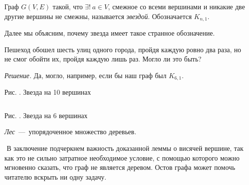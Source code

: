 \begin{paracol}{2}
\begin{definition}
	Граф $G(V, E)$ такой, что $\exists! \!\ a \in V$, смежное со всеми вершинами и никакие две другие вершины не смежны, называется \emph{звездой}. Обозначается $K_{n, 1}$.
\end{definition}

	Далее мы объясним, почему звезда имеет такое странное обозначение.

\begin{example}
	Пешеход обошел шесть улиц одного города, пройдя каждую ровно два раза, но не смог обойти их, пройдя каждую лишь раз. Могло ли это быть?
	
	\emph{Решение.} Да, могло, например, если бы наш граф был $K_{6, 1}$.
\end{example}

\switchcolumn
 
\begin{center}

	\small Рис. \images. Звезда на 10 вершинах
\end{center}
$ $
\newline
\begin{center}

	\small Рис. \images. Звезда на 6 вершинах
\end{center}
\end{paracol}

\begin{definition}
	\emph{Лес}~---~упорядоченное множество деревьев.
\end{definition}

$ $
\newline
	В заключение подчеркнем важность доказанной леммы о висячей вершине, так как это не сильно затратное необходимое условие, с помощью которого можно мгновенно сказать, что граф не является деревом. Остов графа может помочь читателю вскрыть ни одну задачу.

